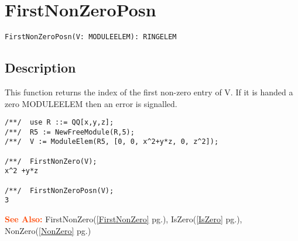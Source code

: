\documentclass[a4paper]{mybook}
\newenvironment{command}{}{} %
\newcommand\SeeAlso{\par\textcolor{OrangeRed}{\textbf{\large See Also: }}}
\begin{document}
\section{FirstNonZeroPosn}
\label{FirstNonZeroPosn}
\begin{command} %


\begin{Verbatim}[label=syntax, rulecolor=\color{MidnightBlue},
frame=single]
FirstNonZeroPosn(V: MODULEELEM): RINGELEM
\end{Verbatim}


\subsection*{Description}

This function returns the index of the first non-zero entry of V.  If it
is handed a zero MODULEELEM then an error is signalled.
\begin{Verbatim}[label=example, rulecolor=\color{PineGreen}, frame=single]
/**/  use R ::= QQ[x,y,z];
/**/  R5 := NewFreeModule(R,5);
/**/  V := ModuleElem(R5, [0, 0, x^2+y*z, 0, z^2]);

/**/  FirstNonZero(V);
x^2 +y*z

/**/  FirstNonZeroPosn(V);
3
\end{Verbatim}


\SeeAlso %
  FirstNonZero(\ref{FirstNonZero} pg.\pageref{FirstNonZero}), 
    IsZero(\ref{IsZero} pg.\pageref{IsZero}), 
    NonZero(\ref{NonZero} pg.\pageref{NonZero})
\end{command} %
\end{document}
